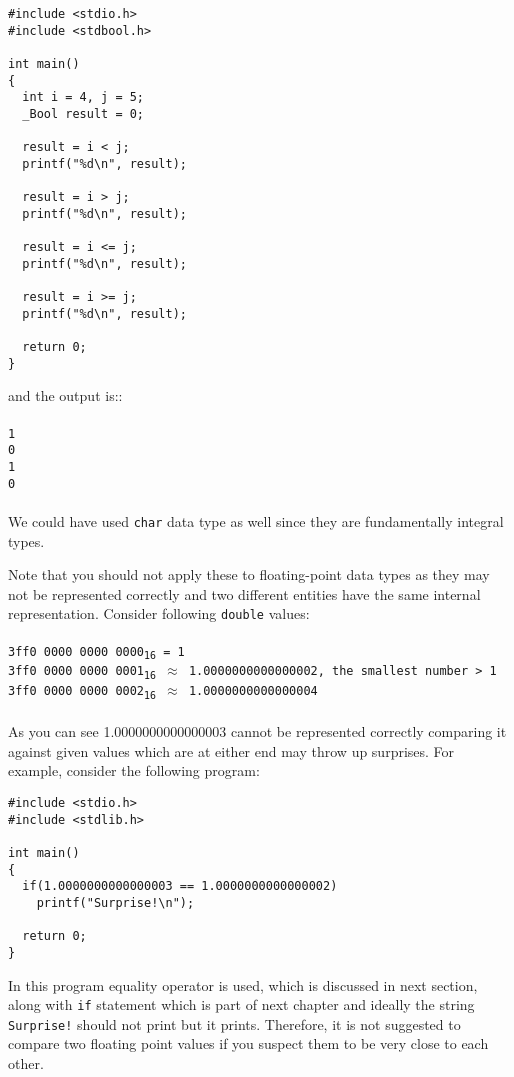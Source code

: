 \begin{verbatim}
#include <stdio.h>
#include <stdbool.h>

int main()
{
  int i = 4, j = 5;
  _Bool result = 0;

  result = i < j;
  printf("%d\n", result);

  result = i > j;
  printf("%d\n", result);

  result = i <= j;
  printf("%d\n", result);

  result = i >= j;
  printf("%d\n", result);

  return 0;
}
\end{verbatim}

and the output is::
\\\\\texttt{1\\
0\\
1\\
0\\\\}
We could have used \texttt{char} data type as well since they are fundamentally 
integral types.


Note that you should not apply these to floating-point data types as they may
not be represented correctly and two different entities have the same internal
representation. Consider following \texttt{double} values:
\\\\\texttt{3ff0 0000 0000 0000\textsubscript{16}   = 1\\
3ff0 0000 0000 0001\textsubscript{16}   $\approx$ 1.0000000000000002, 
the smallest 
number > 1\\
3ff0 0000 0000 0002\textsubscript{16} $\approx$ 1.0000000000000004\\\\}
As you can see 1.0000000000000003 cannot be represented correctly comparing it 
against given values which are at either end may throw up surprises. For 
example, consider the following program:

\begin{verbatim}
#include <stdio.h>
#include <stdlib.h>

int main()
{
  if(1.0000000000000003 == 1.0000000000000002)
    printf("Surprise!\n");

  return 0;
}
\end{verbatim}

In this program equality operator is used, which is discussed in next section, 
along with \texttt{if} statement which is part of next chapter and ideally the  
string \texttt{Surprise!} should not print but it prints. Therefore, it is not 
suggested to compare two floating point values if you suspect them to be very 
close to each other.

